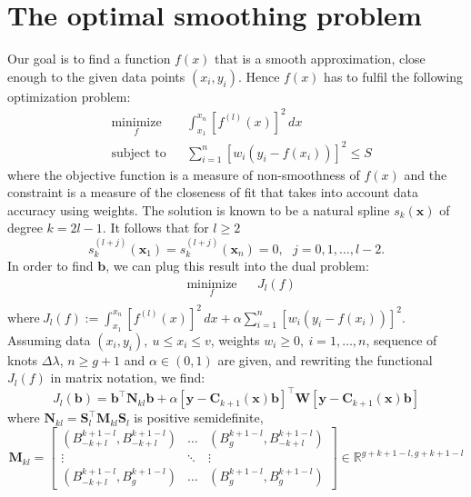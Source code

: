 \section{The optimal smoothing problem} \label{optimal}
Our goal is to find a function $f(x)$ that is a smooth approximation, close enough to the given data points $(x_i,y_i)$. Hence $f(x)$ has to fulfil the following optimization problem:
\begin{equation*} 
\begin{aligned}
& \underset{f}{\text{minimize}}
& & \int_{x_1}^{x_n} [f^{(l)}(x)]^2 \,dx \\
& \text{subject to}
& & \sum\limits_{i=1}^{n}[w_i(y_i-f(x_i))]^2 \le S
\end{aligned}
\end{equation*}
where the objective function is a measure of non-smoothness of $f(x)$ and the constraint is a measure of the closeness of fit that takes into account data accuracy using weights.
The solution is known to be a natural spline $s_k(\textbf{x})$ of degree $k=2l-1$.
It follows that for $l \ge 2$  
\[s_k^{(l+j)}(\textbf{x}_1)=s_k^{(l+j)}(\textbf{x}_n)=0, \ \ \ j=0,1,\dots,l-2.\]
In order to find $\textbf{b}$, we can plug this result into the dual problem:
\begin{equation*} 
\begin{aligned}
& \underset{f}{\text{minimize}}
& &  J_l(f) \\
\end{aligned}
\end{equation*}
$\text{where} \ J_l(f) :=\int_{x_1}^{x_n} [f^{(l)}(x)]^2 \,dx + \alpha \sum\limits_{i=1}^{n}[w_i(y_i-f(x_i))]^2$.\\
Assuming data $(x_i,y_i), \ u\le x_i \le v$, weights $w_i \ge 0, \ i=1, \dots, n$, sequence of knots $\Delta\lambda$, $n \ge g+1 $ and $\alpha \in (0,1)$ are given, %
and rewriting the functional $J_l(f)$ in matrix notation, we find:
\[J_l(\textbf{b}) = \textbf{b}^\top \textbf{N}_{kl}\textbf{b} + \alpha [\textbf{y}-\textbf{C}_{k+1}(\textbf{x})\textbf{b}]^\top \textbf{W} [\textbf{y}-\textbf{C}_{k+1}(\textbf{x})\textbf{b}]\]
where $\textbf{N}_{kl} =  \textbf{S}_l^\top \textbf{M}_{kl}\textbf{S}_l$ is positive semidefinite, 
\[  \textbf{M}_{kl} =
\begin{bmatrix}
(B_{-k+l}^{k+1-l}, B_{-k+l}^{k+1-l}) & \dots  & (B_{g}^{k+1-l}, B_{-k+l}^{k+1-l}) \\
\vdots & \ddots & \vdots \\
(B_{-k+l}^{k+1-l}, B_{g}^{k+1-l}) &  \dots  & (B_{g}^{k+1-l}, B_{g}^{k+1-l})
\end{bmatrix} \in \mathbb{R}^{g+k+1-l, g+k+1-l} \]
